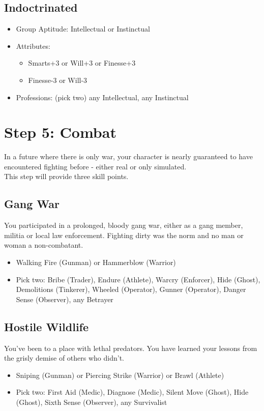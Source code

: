 \subsection{Indoctrinated}
\begin{itemize}
	\item Group Aptitude: Intellectual or Instinctual
	\item Attributes:
	\begin{itemize}
		\item Smarts+3 or Will+3 or Finesse+3
		\item Finesse-3 or Will-3
	\end{itemize}
	\item Professions: (pick two) any Intellectual, any Instinctual
\end{itemize}



\section{Step 5: Combat} %
\label{sec:lifepath_5_combat}
In a future where there is only war, your character is nearly guaranteed to have encountered fighting before - either real or only simulated.\\
This step will provide three skill points.

\subsection{Gang War}
You participated in a prolonged, bloody gang war, either as a gang member, militia or local law enforcement. Fighting dirty was the norm and no man or woman a non-combatant.
\begin{itemize}
	\item Walking Fire (Gunman) or Hammerblow (Warrior)
	\item Pick two: Bribe (Trader), Endure (Athlete), Warcry (Enforcer), Hide (Ghost), Demolitions (Tinkerer), Wheeled (Operator), Gunner (Operator), Danger Sense (Observer), any Betrayer
\end{itemize}

\subsection{Hostile Wildlife}
You've been to a place with lethal predators. You have learned your lessons from the grisly demise of others who didn't.
\begin{itemize}
	\item Sniping (Gunman) or Piercing Strike (Warrior) or Brawl (Athlete)
	\item Pick two: First Aid (Medic), Diagnose (Medic), Silent Move (Ghost), Hide (Ghost), Sixth Sense (Observer), any Survivalist 
\end{itemize}

